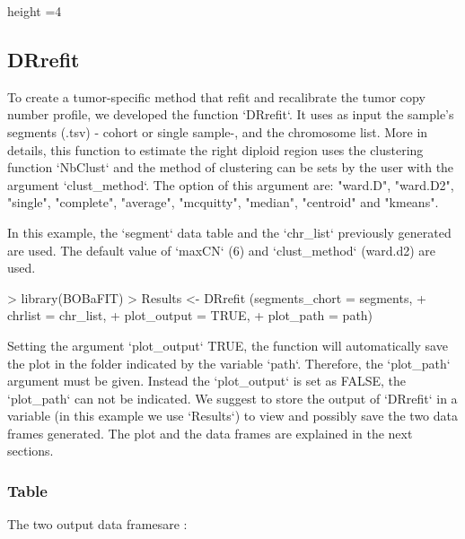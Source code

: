 \documentclass{article}
\begin{document}
 {height =4}

\subsection*{DRrefit}
To create a tumor-specific method that refit and recalibrate the tumor copy number profile, we developed the function `DRrefit`. It uses as input the sample's segments (.tsv) - cohort or single sample-, and the chromosome list. More in details, this function to estimate the right diploid region uses the clustering function `NbClust` \cite{10.18637/jss.v061.i06} and the method of clustering can be sets by the user with the argument `clust_method`. The option of this argument are: "ward.D", "ward.D2", "single", "complete", "average", "mcquitty", "median", "centroid" and "kmeans".

In this example, the `segment` data table and the `chr_list` previously generated are used. The default value of `maxCN` (6) and `clust_method` (ward.d2) are used.

\begin{Schunk}
\begin{Sinput}
> library(BOBaFIT)
> Results <- DRrefit (segments_chort = segments,
+         chrlist = chr_list,
+         plot_output = TRUE,
+         plot_path = path)
\end{Sinput}
\end{Schunk}

Setting the argument `plot_output` TRUE, the function will automatically save the plot in the folder indicated by the variable `path`. Therefore, the `plot_path` argument must be given. Instead the `plot_output` is set as FALSE, the `plot_path` can not be indicated. We suggest to store the output of `DRrefit` in a variable (in this example we use `Results`) to view and possibly save the two data frames generated. The plot and the data frames are explained in the next sections.

\subsubsection*{Table}
The two output data framesare :
\end{document}
